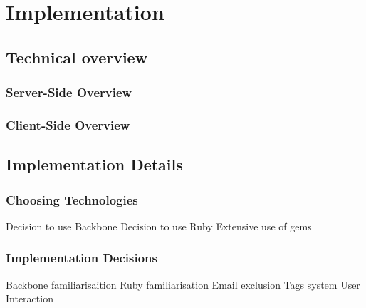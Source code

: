 \section{Implementation}

\subsection{Technical overview}
\subsubsection{Server-Side Overview}
\subsubsection{Client-Side Overview}

\subsection{Implementation Details}
\subsubsection{Choosing Technologies}
Decision to use Backbone
Decision to use Ruby
Extensive use of gems

\subsubsection{Implementation Decisions}
Backbone familiarisaition
Ruby familiarisation
Email exclusion
Tags system
User Interaction
